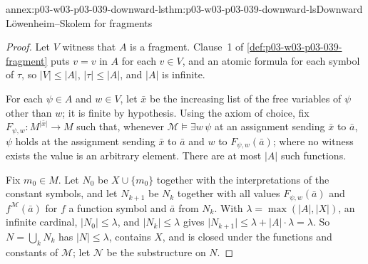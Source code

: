 \begin{annexitem}{annex:p03-w03-p03-039-downward-ls}{thm:p03-w03-p03-039-downward-ls}{Downward L\"owenheim--Skolem for fragments}
\begin{proof}
Let \(V\) witness that \(A\) is a fragment. Clause~1 of
\cref{def:p03-w03-p03-039-fragment} puts \(v=v\) in \(A\) for each
\(v\in V\), and an atomic formula for each symbol of \(\tau\), so
\(\lvert V\rvert\le\lvert A\rvert\), \(\lvert\tau\rvert\le\lvert A\rvert\),
and \(\lvert A\rvert\) is infinite.

For each \(\psi\in A\) and \(w\in V\), let \(\bar x\) be the increasing list
of the free variables of \(\psi\) other than \(w\); it is finite by
hypothesis. Using the axiom of choice, fix
\(F_{\psi,w}:M^{\lvert\bar x\rvert}\to M\) such that, whenever
\(\mathcal M\models\exists w\,\psi\) at an assignment sending \(\bar x\) to
\(\bar a\), \(\psi\) holds at the assignment sending \(\bar x\) to \(\bar a\)
and \(w\) to \(F_{\psi,w}(\bar a)\); where no witness exists the value is an
arbitrary element. There are at most \(\lvert A\rvert\) such functions.

Fix \(m_0\in M\). Let \(N_0\) be \(X\cup\{m_0\}\) together with the
interpretations of the constant symbols, and let \(N_{k+1}\) be \(N_k\)
together with all values \(F_{\psi,w}(\bar a)\) and \(f^{\mathcal M}(\bar a)\)
for \(f\) a function symbol and \(\bar a\) from \(N_k\). With
\(\lambda=\max(\lvert A\rvert,\lvert X\rvert)\), an infinite cardinal,
\(\lvert N_0\rvert\le\lambda\), and \(\lvert N_k\rvert\le\lambda\) gives
\(\lvert N_{k+1}\rvert\le\lambda+\lvert A\rvert\cdot\lambda=\lambda\). So
\(N=\bigcup_kN_k\) has \(\lvert N\rvert\le\lambda\), contains \(X\), and is
closed under the functions and constants of \(\mathcal M\); let
\(\mathcal N\) be the substructure on \(N\).


\end{proof}
\end{annexitem}
